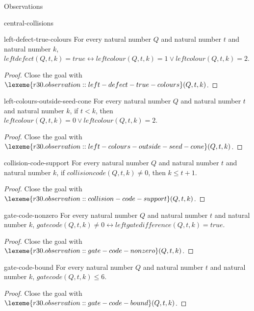 \begin{lexlean}{Observations}
\begin{section}{central-collisions}
\begin{theorem}{left-defect-true-colours}
For every natural number \(Q\) and natural number \(t\) and natural number \(k\), \(leftdefect(Q, t, k) = true ↔ leftcolour(Q, t, k) = 1 ∨ leftcolour(Q, t, k) = 2\).
\begin{proof}
Close the goal with \(\lexeme{r30.observation::left-defect-true-colours}(Q, t, k)\).
\end{proof}
\end{theorem}

\begin{theorem}{left-colours-outside-seed-cone}
For every natural number \(Q\) and natural number \(t\) and natural number \(k\), if \(t < k\), then \(leftcolour(Q, t, k) = 0 ∨ leftcolour(Q, t, k) = 2\).
\begin{proof}
Close the goal with \(\lexeme{r30.observation::left-colours-outside-seed-cone}(Q, t, k)\).
\end{proof}
\end{theorem}

\begin{theorem}{collision-code-support}
For every natural number \(Q\) and natural number \(t\) and natural number \(k\), if \(collisioncode(Q, t, k) ≠ 0\), then \(k ≤ t + 1\).
\begin{proof}
Close the goal with \(\lexeme{r30.observation::collision-code-support}(Q, t, k)\).
\end{proof}
\end{theorem}

\begin{theorem}{gate-code-nonzero}
For every natural number \(Q\) and natural number \(t\) and natural number \(k\), \(gatecode(Q, t, k) ≠ 0 ↔ leftgatedifference(Q, t, k) = true\).
\begin{proof}
Close the goal with \(\lexeme{r30.observation::gate-code-nonzero}(Q, t, k)\).
\end{proof}
\end{theorem}

\begin{theorem}{gate-code-bound}
For every natural number \(Q\) and natural number \(t\) and natural number \(k\), \(gatecode(Q, t, k) ≤ 6\).
\begin{proof}
Close the goal with \(\lexeme{r30.observation::gate-code-bound}(Q, t, k)\).
\end{proof}
\end{theorem}


\end{section}
\end{lexlean}
